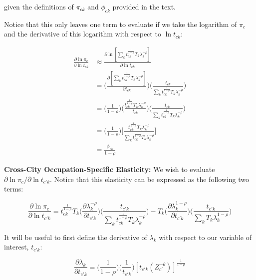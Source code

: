\documentclass[10pt]{article}
\begin{document}
given the definitions of $\pi_{ck}$ and $\phi_{ck}$ provided in the text.

Notice that this only leaves one term to evaluate if we take the logarithm of $\pi_{c}$ and the derivative of this logarithm with respect to $\ln{t_{ck}}$:

\begin{align*}
    \frac{\partial\ln{\pi_{c}}}{\partial\ln{t_{ck}}} & \approx \frac{\partial\ln[{\sum\limits_{k}{t^{\frac{1}{1-\rho}}_{ck}}{T_{k}}\lambda_{k}^{-\rho}}]}{\partial\ln{t_{ck}}} \\ &= \Bigg(\frac{\partial[{\sum\limits_{k}{t^{\frac{1}{1-\rho}}_{ck}}{T_{k}}\lambda_{k}^{-\rho}}]}{\partial{t_{ck}}}\Bigg)\Bigg(\frac{t_{ck}}{{\sum\limits_{k}{t^{\frac{1}{1-\rho}}_{ck}}{T_{k}}\lambda_{k}^{-\rho}}}\Bigg)\\ &= \Bigg(\frac{1}{1-\rho}\Bigg)\Bigg(\frac{t_{ck}^{\frac{1}{1-\rho}}{T_{k}}\lambda_{k}^{-\rho}}{t_{ck}}\Bigg)\Bigg(\frac{t_{ck}}{{\sum\limits_{k}{t^{\frac{1}{1-\rho}}_{ck}}{T_{k}}\lambda_{k}^{-\rho}}}\Bigg) \\ &= \Big(\frac{1}{1-\rho}\Big)\Bigg[\frac{{t^{\frac{1}{1-\rho}}_{ck}}{T_{k}}\lambda_{k}^{-\rho}}{\sum\limits_{k}{t^{\frac{1}{1-\rho}}_{ck}}{T_{k}}\lambda_{k}^{-\rho}}\Bigg]\\ &= \frac{\phi_{ck}}{1-\rho}
\end{align*}

\noindent\textbf{Cross-City Occupation-Specific Elasticity:} We wish to evaluate $\partial\ln{\pi_{c}}/\partial\ln{t_{{c'}k}}$. Notice that this elasticity can be expressed as the following two terms:

\begin{equation*}
    \frac{\partial\ln{\pi_{c}}}{\partial\ln{t_{{c'}k}}} = {t^{\frac{1}{1-\rho}}_{ck}}{T_{k}}\Big(\frac{\partial\lambda_{k}^{-\rho}}{\partial{t_{{c'}k}}}\Big)\Big(\frac{t_{{c'}k}}{{\sum\limits_{k}{t^{\frac{1}{1-\rho}}_{ck}}{T_{k}}\lambda_{k}^{-\rho}}}\Big) - {T_{k}}\Big(\frac{\partial\lambda_{k}^{1-\rho}}{\partial{t_{{c'}k}}}\Big)\Big(\frac{t_{{c'}k}}{{\sum\limits_{k}{T_{k}}\lambda_{k}^{1-\rho}}}\Big)
\end{equation*}

It will be useful to first define the derivative of $\lambda_{k}$ with respect to our variable of interest, $t_{{c'}k}$:

\begin{equation*}
    \frac{\partial{\lambda_{k}}}{\partial{t_{{c'}k}}} = \Big(\frac{1}{1-\rho}\Big)\Big(\frac{1}{t_{{c'}k}}\Big)[{t_{{c'}k}}(Z_{c'}^{-\theta})]^{\frac{1}{1-\rho}}
\end{equation*}
\end{document}
